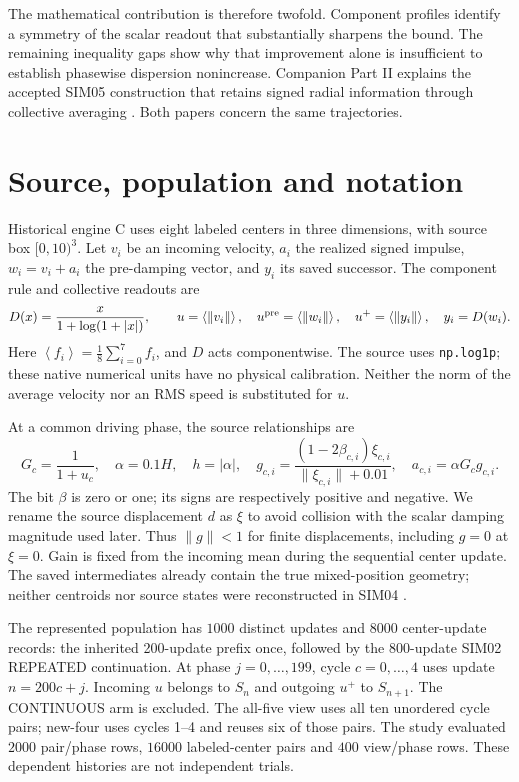 \documentclass[11pt,a4paper]{article}
\newcommand{\avg}[1]{\left\langle #1\right\rangle}
\begin{document}
The mathematical contribution is therefore twofold. Component profiles identify a symmetry of the scalar readout that substantially sharpens the bound. The remaining inequality gaps show why that improvement alone is insufficient to establish phasewise dispersion nonincrease. Companion Part II explains the accepted SIM05 construction that retains signed radial information through collective averaging \cite{parttwo}. Both papers concern the same trajectories.

\clearpage
\section{Source, population and notation}\label{sec:setup}
Historical engine C uses eight labeled centers in three dimensions, with source box $[0,10)^3$. Let $v_i$ be an incoming velocity, $a_i$ the realized signed impulse, $w_i=v_i+a_i$ the pre-damping vector, and $y_i$ its saved successor. The component rule and collective readouts are
\begin{equation}\label{eq:source}
D(x)=\frac{x}{1+\log(1+|x|)},\qquad
u=\avg{\|v_i\|},\quad u^{\rm pre}=\avg{\|w_i\|},\quad u^+=\avg{\|y_i\|},\quad y_i=D(w_i).
\end{equation}
Here $\avg{f_i}=\frac18\sum_{i=0}^7 f_i$, and $D$ acts componentwise. The source uses \texttt{np.log1p}; these native numerical units have no physical calibration. Neither the norm of the average velocity nor an RMS speed is substituted for $u$.

At a common driving phase, the source relationships are
\begin{equation}\label{eq:impulse}
G_c=\frac1{1+u_c},\quad \alpha=0.1H,\quad h=|\alpha|,\quad
g_{c,i}=\frac{(1-2\beta_{c,i})\xi_{c,i}}{\|\xi_{c,i}\|+0.01},\quad a_{c,i}=\alpha G_c g_{c,i}.
\end{equation}
The bit $\beta$ is zero or one; its signs are respectively positive and negative. We rename the source displacement $d$ as $\xi$ to avoid collision with the scalar damping magnitude used later. Thus $\|g\|<1$ for finite displacements, including $g=0$ at $\xi=0$. Gain is fixed from the incoming mean during the sequential center update. The saved intermediates already contain the true mixed-position geometry; neither centroids nor source states were reconstructed in SIM04 \cite{source,simthree}.

The represented population has \ensuremath{1000} distinct updates and \ensuremath{8000} center-update records: the inherited 200-update prefix once, followed by the 800-update SIM02 REPEATED continuation. At phase $j=0,\ldots,199$, cycle $c=0,\ldots,4$ uses update $n=200c+j$. Incoming $u$ belongs to $S_n$ and outgoing $u^+$ to $S_{n+1}$. The CONTINUOUS arm is excluded. The all-five view uses all ten unordered cycle pairs; new-four uses cycles 1--4 and reuses six of those pairs. The study evaluated \ensuremath{2000} pair/phase rows, \ensuremath{16000} labeled-center pairs and \ensuremath{400} view/phase rows. These dependent histories are not independent trials.
\end{document}
